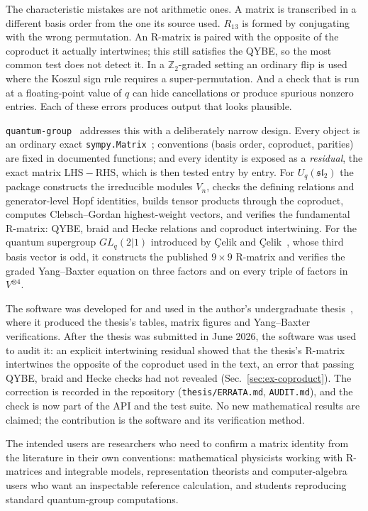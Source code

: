 \documentclass{SciPost}
\newcommand{\pkg}{\texttt{quantum-group}}
\newcommand{\code}[1]{\texttt{\begingroup\def\_{\textunderscore\allowbreak}#1\endgroup}}
\newcommand{\Uq}{U_q(\mathfrak{sl}_2)}
\newcommand{\GL}{GL_q(2|1)}
\begin{document}
The characteristic mistakes are not arithmetic ones. A matrix is transcribed in a different basis order from the one its source used. $R_{13}$ is formed by conjugating with the wrong permutation. An R-matrix is paired with the opposite of the coproduct it actually intertwines; this still satisfies the QYBE, so the most common test does not detect it. In a $\mathbb{Z}_2$-graded setting an ordinary flip is used where the Koszul sign rule requires a super-permutation. And a check that is run at a floating-point value of $q$ can hide cancellations or produce spurious nonzero entries. Each of these errors produces output that looks plausible.

\pkg{}~\cite{quantumgroup111} addresses this with a deliberately narrow design. Every object is an ordinary exact \code{sympy.Matrix}~\cite{meurer2017sympy}; conventions (basis order, coproduct, parities) are fixed in documented functions; and every identity is exposed as a \emph{residual}, the exact matrix $\mathrm{LHS}-\mathrm{RHS}$, which is then tested entry by entry. For $\Uq$ the package constructs the irreducible modules $V_n$, checks the defining relations and generator-level Hopf identities, builds tensor products through the coproduct, computes Clebsch--Gordan highest-weight vectors, and verifies the fundamental R-matrix: QYBE, braid and Hecke relations and coproduct intertwining. For the quantum supergroup $\GL$ introduced by Çelik and Çelik~\cite{celik2021}, whose third basis vector is odd, it constructs the published $9\times9$ R-matrix and verifies the graded Yang--Baxter equation on three factors and on every triple of factors in $V^{\otimes4}$.

The software was developed for and used in the author's undergraduate thesis~\cite{terekli2026thesis}, where it produced the thesis's tables, matrix figures and Yang--Baxter verifications. After the thesis was submitted in June 2026, the software was used to audit it: an explicit intertwining residual showed that the thesis's R-matrix intertwines the opposite of the coproduct used in the text, an error that passing QYBE, braid and Hecke checks had not revealed (Sec.~\ref{sec:ex-coproduct}). The correction is recorded in the repository (\code{thesis/ERRATA.md}, \code{AUDIT.md}), and the check is now part of the API and the test suite. No new mathematical results are claimed; the contribution is the software and its verification method.

The intended users are researchers who need to confirm a matrix identity from the literature in their own conventions: mathematical physicists working with R-matrices and integrable models, representation theorists and computer-algebra users who want an inspectable reference calculation, and students reproducing standard quantum-group computations.
\end{document}
